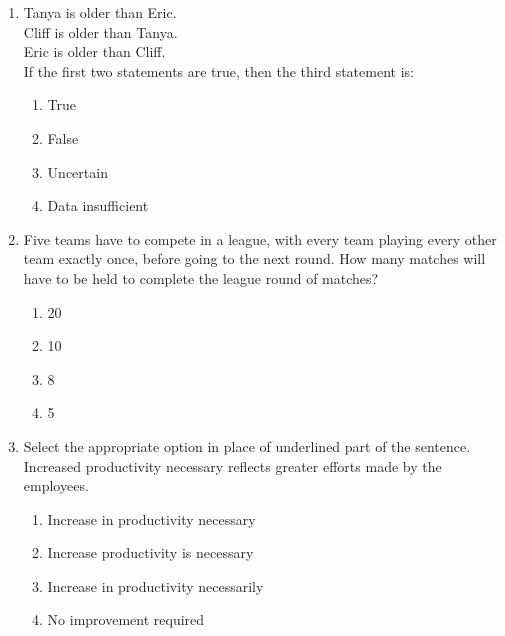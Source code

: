 \documentclass{article}
\begin{document}
\begin{enumerate}
\item Tanya is older than Eric.\\
Cliff is older than Tanya.\\
Eric is older than Cliff.\\
If the first two statements are true, then the third statement is:

\begin{multicols}{4}
\begin{enumerate}
\item True
\item False
\item Uncertain
\item Data insufficient
\end{enumerate}
\end{multicols}

\item Five teams have to compete in a league, with every team playing every other team exactly once, before going to the next round. How many matches will have to be held to complete the league round of matches?
\begin{multicols}{4}
\begin{enumerate}
\item 20
\item 10
\item 8
\item 5
\end{enumerate}
\end{multicols}

\item Select the appropriate option in place of underlined part of the sentence.
Increased productivity necessary reflects greater efforts made by the employees.
\begin{enumerate}
\item Increase in productivity necessary
\item Increase productivity is necessary
\item Increase in productivity necessarily
\item No improvement required
\end{enumerate}


\end{enumerate}
\end{document}
